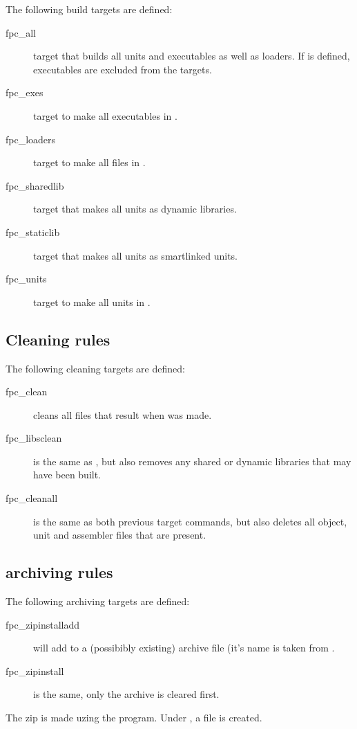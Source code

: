 \documentclass{report}
\begin{document}
The following build targets are defined:
\begin{description}
\item[fpc\_all] target that builds all units and executables as well as
loaders. If  is defined, executables are excluded from the
targets.
\item[fpc\_exes] target to make all executables in .
\item[fpc\_loaders] target to make all files in .
\item[fpc\_sharedlib] target that makes all units as dynamic libraries.
\item[fpc\_staticlib] target that makes all units as smartlinked units.
\item[fpc\_units] target to make all units in .
\end{description}

\subsection{Cleaning rules}

The following cleaning targets are defined:
\begin{description}
\item[fpc\_clean] cleans all files that result when  was made.
\item[fpc\_libsclean] is the same as , but also removes any
shared or dynamic libraries that may have been built.
\item[fpc\_cleanall] is the same as both previous target commands, but also
deletes all object, unit and assembler files that are present.
\end{description}

\subsection{archiving rules}

The following archiving targets are defined:
\begin{description}
\item[fpc\_zipinstalladd] will add to a (possibibly existing) archive file (it's
name is taken from . 
\item[fpc\_zipinstall] is the same, only the archive is cleared first.
\end{description}
The zip is made uzing the  program. Under \linux, a
 file is created.
\end{document}
